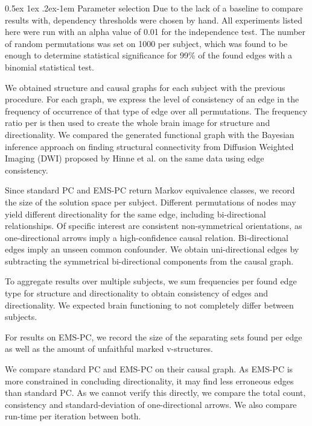 \documentclass[a4paper, english]{article}
\makeatletter
\renewcommand{\paragraph}{%
  \@startsection{paragraph}{4}%
  {\z@}{0.5ex \@plus 1ex \@minus .2ex}{-1em}%
  {\normalfont\normalsize\bfseries}%
}
\makeatother
\begin{document}
\paragraph{Parameter selection}
Due to the lack of a baseline to compare results with, dependency thresholds were chosen by hand.
All experiments listed here were run with an alpha value of 0.01 for the independence test.
The number of random permutations was set on 1000 per subject, which was found to be enough to determine statistical significance for 99\% of the found edges with a binomial statistical test.

We obtained structure and causal graphs for each subject with the previous procedure.
For each graph, we express the level of consistency of an edge in the frequency of occurrence of that type of edge over all permutations.
The frequency ratio per is then used to create the whole brain image for structure and directionality.
We compared the generated functional graph with the Bayesian inference approach on finding structural connectivity from Diffusion Weighted Imaging (DWI) proposed by Hinne et al.\cite{hinne2013} on the same data using edge consistency.

Since standard PC and EMS-PC return Markov equivalence classes, we record the size of the solution space per subject.
Different permutations of nodes may yield different directionality for the same edge, including bi-directional relationships.
Of specific interest are consistent non-symmetrical orientations, as one-directional arrows imply a high-confidence causal relation.
Bi-directional edges imply an unseen common confounder.
We obtain uni-directional edges by subtracting the symmetrical bi-directional components from the causal graph.

To aggregate results over multiple subjects, we sum frequencies per found edge type for structure and directionality to obtain consistency of edges and directionality.
We expected brain functioning to not completely differ between subjects.

For results on EMS-PC, we record the size of the separating sets found per edge as well as the amount of unfaithful marked v-structures.

We compare standard PC and EMS-PC on their causal graph.
As EMS-PC is more constrained in concluding directionality, it may find less erroneous edges than standard PC.
As we cannot verify this directly, we compare the total count, consistency and standard-deviation of one-directional arrows.
We also compare run-time per iteration between both.
\end{document}
